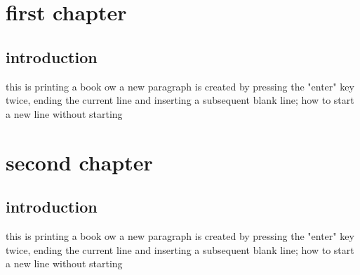 \documentclass{book}
\begin{document}
	\chapter{ first chapter}
	\section{introduction}
	this is printing a book
	ow a new paragraph is created by pressing the "enter" key twice, ending the
	current line and inserting a subsequent blank line;
	how to start a new line without starting
	
	\chapter{ second chapter}
	\section{introduction}
	this is printing a book
	ow a new paragraph is created by pressing the "enter" key twice, ending the
	current line and inserting a subsequent blank line;
	how to start a new line without starting
\end{document}
